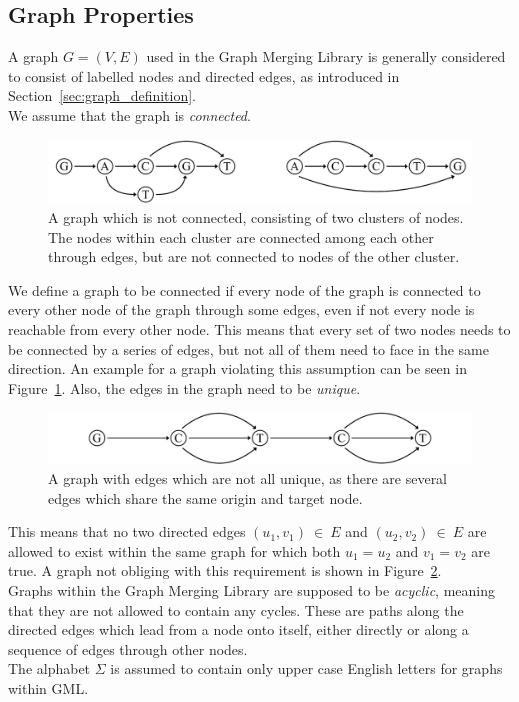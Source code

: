 \documentclass[a4paper,12pt,twoside,BCOR=10mm]{scrbook}
\begin{document}
\subsection{Graph Properties}

A graph $ G = (V, E) $ used in the Graph Merging Library is generally considered to consist of labelled nodes
and directed edges, as introduced in Section~\ref{sec:graph_definition}. \\
We assume that the graph is \textit{connected}.
\begin{figure}[!htb]
\centering
\includegraphics[width=\textwidth]{evo_fig_assume_connectedness.pdf}
\caption[Graph which is not connected]{A graph which is not connected, consisting of two clusters of nodes. The nodes within each cluster are connected among each other through edges, but are not connected to nodes of the other cluster.} \label{fig:evo_fig_assume_connectedness}
\end{figure}
We define a graph to be connected if every node of the graph is connected to every other node of the graph through some edges,
even if not every node is reachable from every other node. This means that every
set of two nodes needs to be connected by a series of edges, but not all of them need to face in the same direction.
An example for a graph violating this assumption can be seen in Figure~\ref{fig:evo_fig_assume_connectedness}.
Also, the edges in the graph need to be \textit{unique}.
\begin{figure}[!htb]
\centering
\includegraphics[width=\textwidth]{evo_fig_assume_unique_edges.pdf}
\caption[Graph with edges which are not unique]{A graph with edges which are not all unique, as there are several edges which share the same origin and target node.} \label{fig:evo_fig_assume_unique_edges}
\end{figure}
This means that no two directed edges $ (u_1, v_1) {\: \in \:} E $ and $ (u_2, v_2) {\: \in \:} E $ are allowed to
exist within the same graph for which both $ u_1 = u_2 $ and $ v_1 = v_2 $ are true.
A graph not obliging with this requirement is shown in Figure~\ref{fig:evo_fig_assume_unique_edges}. \\
Graphs within the Graph Merging Library are supposed to be \textit{acyclic},
meaning that they are not allowed to contain any cycles. These are paths along
the directed edges which lead from a node onto itself, either directly or along a sequence of edges through other nodes. \\
The alphabet $ \Sigma $ is assumed to contain only upper case English letters for graphs within GML.
\end{document}
